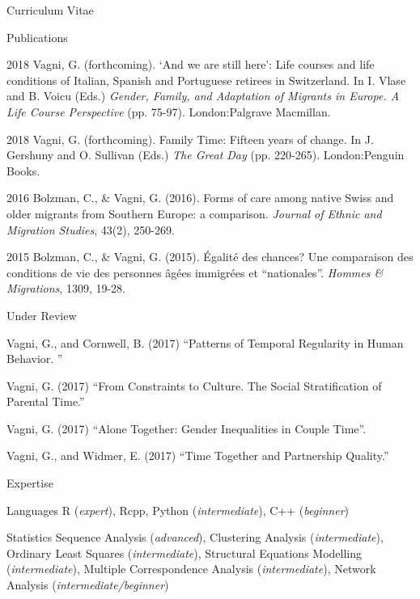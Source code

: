 \documentclass[10pt,a4paper]{article}
\newcommand*{\ac}[1]{\mbox{#1}}
\begin{document}
\begin{cv}{Curriculum Vitae}
 
 \newpage
 
   \begin{cvlist}{Publications}
	
	 \item [2018] Vagni, G. (forthcoming). ‘And we are still here’: Life courses and life conditions of Italian, Spanish and Portuguese retirees in Switzerland. In I. Vlase and B. Voicu (Eds.) \emph{Gender, Family, and Adaptation of Migrants in Europe. A Life Course Perspective} (pp. 75-97). London:Palgrave Macmillan.

   	 \item [2018] Vagni, G. (forthcoming). Family Time: Fifteen years of change. In J. Gershuny and O. Sullivan (Eds.) \emph{The Great Day} (pp. 220-265). London:Penguin Books.  
  
   	\item [2016] Bolzman, C., \& Vagni, G. (2016). Forms of care among native Swiss and older migrants from Southern Europe: a comparison. \emph{Journal of Ethnic and Migration Studies}, 43(2), 250-269.
   	
   	\item [2015]
   	Bolzman, C., \& Vagni, G. (2015). {\'E}galit{\'e} des chances? Une
   	comparaison des conditions de vie des personnes {\^a}g{\'e}es immigr{\'e}es
   	et ``nationales''. \emph{Hommes \& Migrations}, 1309, 19-28.
   \end{cvlist}
 

 \begin{cvlist}{Under Review}
  
   \item Vagni, G., and Cornwell, B. (2017)  ``Patterns of Temporal Regularity in Human Behavior. '' 
      \item Vagni, G. (2017)  ``From Constraints to Culture. The Social Stratification of Parental Time.'' 
      \item Vagni, G. (2017) ``Alone Together: Gender Inequalities in Couple Time''. 
      \item Vagni, G., and Widmer, E. (2017)  ``Time Together and Partnership Quality.'' 
      
 \end{cvlist}



  \begin{cvlist}{\ac{Expertise}}
  \item[Languages] R (\emph{expert}), Rcpp, Python (\emph{intermediate}),  C++ (\emph{beginner}) 
  
  \item[Statistics] Sequence Analysis (\emph{advanced}), 
  Clustering Analysis (\emph{intermediate}), 
  Ordinary Least Squares (\emph{intermediate}), Structural Equations Modelling (\emph{intermediate}), Multiple Correspondence Analysis (\emph{intermediate}), 
  Network Analysis (\emph{intermediate/beginner})
  

\end{cvlist}
\end{cv}
\end{document}
